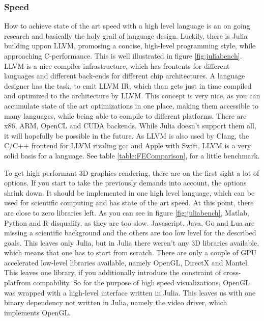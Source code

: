 \subsubsection{Speed}

How to achieve state of the art speed with a high level language is an on going research and basically the holy grail of language design.
Luckily, there is Julia building uppon \ac{LLVM}, promosing a concise, high-level programming style, while approaching C-performance. 
This is well illustrated in figure \ref{fig:juliabench}.
\ac{LLVM} is a nice compiler infrastructure, which has frontents for different languages and different back-ends for different chip architectures. 
A language designer has the task, to emit \ac{LLVM} \ac{IR}, which than gets just in time compiled and optimized to the architecture by \ac{LLVM}.
This concept is very nice, as you can accumulate state of the art optimizations in one place, making them accessible to many languages, while being able to compile to different platforms. There are x86, ARM, OpenCL and CUDA backends. While Julia doesn't support them all, it will hopefully be possible in the future. 
As \ac{LLVM} is also used by Clang, the C/C++ frontend for \ac{LLVM} rivaling gcc and Apple with Swift, \ac{LLVM} is a very solid basis for a language.
See table \ref{table:FEComparison}, for a little benchmark.

To get high performant 3D graphics rendering, there are on the first sight a lot of options.
If you start to take the previously demands into account, the options shrink down.
It should be implemented in one high level language, which can be used for scientific computing and has state of the art speed. At this point, there are close to zero libraries left. As you can see in figure \ref{fig:juliabench}, Matlab, Python and R disqualify, as they are too slow. Javascript, Java, Go and Lua are missing a scientific background and the others are too low level for the described goals.
This leaves only Julia, but in Julia there weren't any 3D libraries available, which means that one has to start from scratch.
There are only a couple of GPU accelerated low-level libraries available, namely OpenGL, DirectX and Mantel. This leaves one library, if you additionally introduce the constraint of cross-platfrom compability.
So for the purpose of high speed visualizations, OpenGL was wrapped with a high-level interface written in Julia. This leaves us with one binary dependency not written in Julia, namely the video driver, which implements OpenGL.

